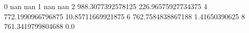 0 nan nan
1 nan nan
2 988.3077392578125 226.96575927734375
4 772.1990966796875 10.85711669921875
6 762.7584838867188 1.41650390625
8 761.3419799804688 0.0
